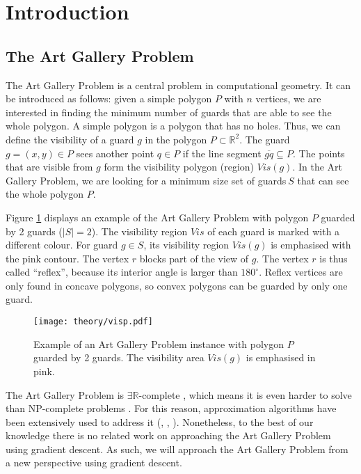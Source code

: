\section{Introduction}
\subsection{The Art Gallery Problem}

The Art Gallery Problem \cite{o1987art} is a central problem in computational geometry. It can be introduced as follows: given a simple polygon $P$ with $n$ vertices, we are interested in finding the minimum number of guards that are able to see the whole polygon. A simple polygon is a polygon that has no holes. Thus, we can define the visibility of a guard $g$ in the polygon $P \subset \mathbb R^2$. The guard $g = (x, y) \in P$ sees another point $q \in P$ if the line segment $\overline{gq} \subseteq P$. The points that are visible from $g$ form the visibility polygon (region) $\mathit{Vis}(g)$. In the Art Gallery Problem, we are looking for a minimum size set of guards$~S$ that can see the whole polygon $P$.

Figure \ref{fig:art} displays an example of the Art Gallery Problem with polygon $P$ guarded by 2 guards ($|S| = 2$). The visibility region $\mathit{Vis}$ of each guard is marked with a different colour. For guard $g \in S$, its visibility region $\mathit{Vis}(g)$ is emphasised with the pink contour. The vertex $r$ blocks part of the view of $g$. The vertex $r$ is thus called ``reflex'', because its interior angle is larger than $180^\circ$. Reflex vertices are only found in concave polygons, so convex polygons can be guarded by only one guard.

\begin{figure}[h!]
    \centering
    \texttt{[image: theory/visp.pdf]}
    \caption{Example of an Art Gallery Problem instance with polygon $P$ guarded by 2 guards. The visibility area $\mathit{Vis}(g)$ is emphasised in pink.}
    \label{fig:art}
\end{figure}

The Art Gallery Problem is $\exists \mathbb R$-complete \cite{abrahamsen2021art}, which means it is even harder to solve than NP-complete problems \cite{schaefer2009complexity}. For this reason, approximation algorithms have been extensively used to address it (\cite{DBLP:journals/corr/BonnetM16b}, \cite{GHOSH2010718}, \cite{DBLP:journals/corr/abs-2007-06920}). Nonetheless, to the best of our knowledge there is no related work on approaching the Art Gallery Problem using gradient descent. As such, we will approach the Art Gallery Problem from a new perspective using gradient descent.

